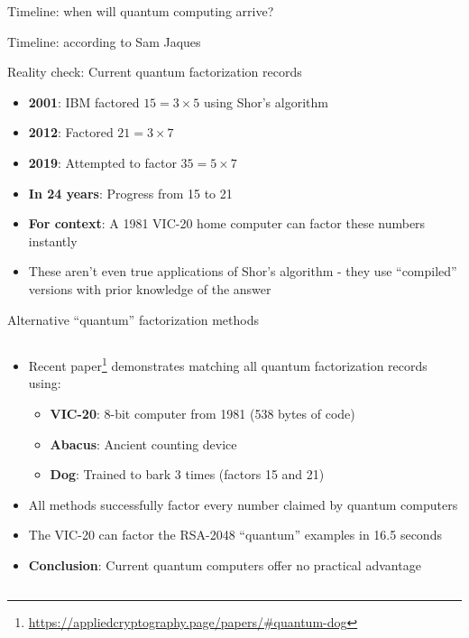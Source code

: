 \documentclass[aspectratio=169, lualatex, handout]{beamer}
\begin{document}
\begin{frame}{Timeline: when will quantum computing arrive?}
\end{frame}

\begin{frame}{Timeline: according to Sam Jaques}
\end{frame}

\begin{frame}{Reality check: Current quantum factorization records}
	\begin{itemize}
		\item \textbf{2001}: IBM factored $15 = 3 \times 5$ using Shor's algorithm
		\item \textbf{2012}: Factored $21 = 3 \times 7$
		\item \textbf{2019}: Attempted to factor $35 = 5 \times 7$
		\item \textbf{In 24 years}: Progress from 15 to 21
		\item \textbf{For context}: A 1981 VIC-20 home computer can factor these numbers instantly
		\item These aren't even true applications of Shor's algorithm - they use ``compiled'' versions with prior knowledge of the answer
	\end{itemize}
\end{frame}

\begin{frame}{Alternative ``quantum'' factorization methods}
	\begin{columns}[c]
		\begin{column}{1\textwidth}
			\begin{itemize}
				\item Recent paper\footnote{\url{https://appliedcryptography.page/papers/\#quantum-dog}} demonstrates matching all quantum factorization records using:
				      \begin{itemize}
					      \item \textbf{VIC-20}: 8-bit computer from 1981 (538 bytes of code)
					      \item \textbf{Abacus}: Ancient counting device
					      \item \textbf{Dog}: Trained to bark 3 times (factors 15 and 21)
				      \end{itemize}
				\item All methods successfully factor every number claimed by quantum computers
				\item The VIC-20 can factor the RSA-2048 ``quantum'' examples in 16.5 seconds
				\item \textbf{Conclusion}: Current quantum computers offer no practical advantage
			\end{itemize}
		\end{column}
	\end{columns}
\end{frame}
\end{document}
